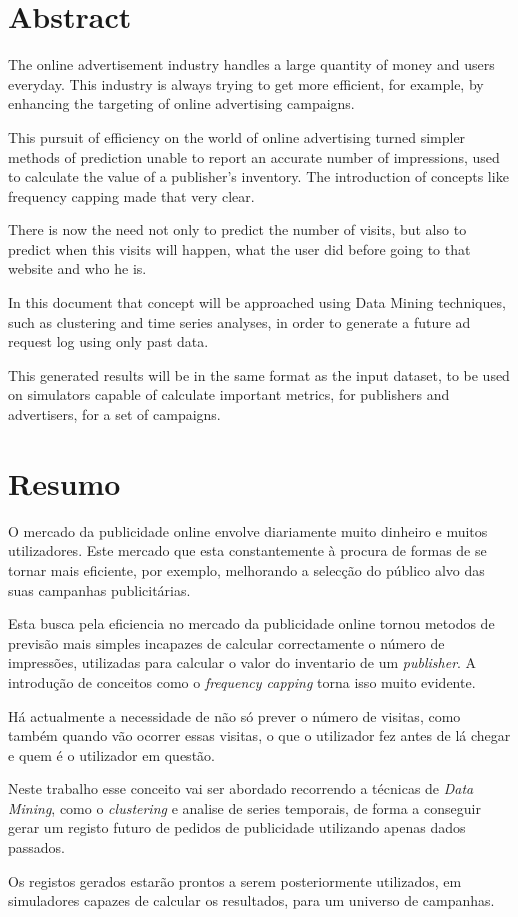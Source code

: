 \chapter*{Abstract}

The online advertisement industry handles a large quantity of money and users
everyday.
This industry is always trying to get more efficient, for example, by enhancing
the targeting of online advertising campaigns. 

This pursuit of efficiency on the world of online advertising turned simpler
methods of prediction unable to report an accurate number of
impressions, used to calculate the value
of a publisher's inventory. The introduction of concepts like frequency capping made that very clear.

There is now the need not only to predict the number of visits, but also to
predict when this visits will happen, what the user did before going to that
website and who he is.

In this document that concept will be approached using Data Mining techniques,
such as clustering and time series analyses, in order to generate a future ad request log
using only past data.

This generated results will be in the same format as the input dataset, to be used on simulators
capable of calculate important metrics, for publishers and advertisers, for a set
of campaigns.

\chapter*{Resumo}

O mercado da publicidade online envolve diariamente muito dinheiro e muitos utilizadores. 
Este mercado que esta constantemente à procura de formas de se tornar
mais eficiente, por exemplo, melhorando a selecção do público alvo das suas campanhas
publicitárias. 

Esta busca pela eficiencia no mercado da publicidade online tornou metodos de
previsão mais simples incapazes de calcular correctamente o número de
impressões, utilizadas para calcular o valor do inventario de um
\textit{publisher}.
A introdução de conceitos como o \textit{frequency capping} torna isso muito evidente.

Há actualmente a necessidade de não só prever o número de visitas, como também
quando vão ocorrer essas visitas, o que o utilizador fez antes de lá chegar e
quem é
o utilizador em questão.

Neste trabalho esse conceito vai ser abordado recorrendo a técnicas de
\textit{Data Mining}, como o \textit{clustering} e analise de series temporais, de forma a conseguir gerar
um registo futuro de pedidos de publicidade utilizando apenas dados passados.

Os registos gerados estarão prontos a serem posteriormente utilizados, em
simuladores capazes de calcular os resultados, para um universo de campanhas.
